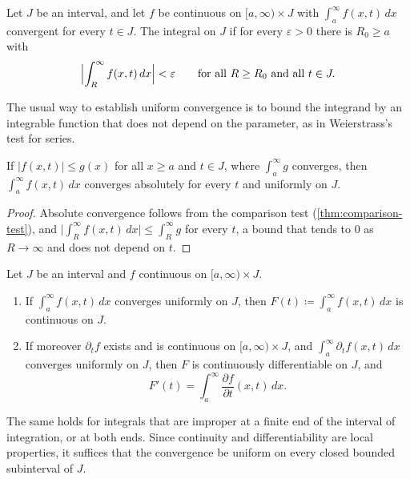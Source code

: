 \begin{definition}
\label{def:uniform-convergence-integral}
Let $J$ be an interval, and let $f$ be continuous on $[a,\infty)\times J$ with $\int_a^\infty f(x,t)\,dx$ convergent for every $t\in J$. The integral  on $J$ if for every $\varepsilon>0$ there is $R_0\ge a$ with
\[
\Bigl|\int_R^\infty f(x,t)\,dx\Bigr|<\varepsilon\qquad\text{for all }R\ge R_0\text{ and all }t\in J .
\]
\end{definition}

The usual way to establish uniform convergence is to bound the integrand by an integrable function that does not depend on the parameter, as in Weierstrass's test for series.

\begin{proposition}[Domination]
\label{prop:weierstrass-test}
If $|f(x,t)|\le g(x)$ for all $x\ge a$ and $t\in J$, where $\int_a^\infty g$ converges, then $\int_a^\infty f(x,t)\,dx$ converges absolutely for every $t$ and uniformly on $J$.
\end{proposition}

\begin{proof}
Absolute convergence follows from the comparison test (\cref{thm:comparison-test}), and $\bigl|\int_R^\infty f(x,t)\,dx\bigr|\le\int_R^\infty g$ for every $t$, a bound that tends to $0$ as $R\to\infty$ and does not depend on $t$.
\end{proof}

\begin{theorem}
\label{thm:parameter-improper}
Let $J$ be an interval and $f$ continuous on $[a,\infty)\times J$.
\begin{enumerate}
\item If $\int_a^\infty f(x,t)\,dx$ converges uniformly on $J$, then $F(t)\coloneqq\int_a^\infty f(x,t)\,dx$ is continuous on $J$.
\item If moreover $\partial_tf$ exists and is continuous on $[a,\infty)\times J$, and $\int_a^\infty\partial_tf(x,t)\,dx$ converges uniformly on $J$, then $F$ is continuously differentiable on $J$, and
\[
F'(t)=\int_a^\infty\frac{\partial f}{\partial t}(x,t)\,dx .
\]
\end{enumerate}
The same holds for integrals that are improper at a finite end of the interval of integration, or at both ends. Since continuity and differentiability are local properties, it suffices that the convergence be uniform on every closed bounded subinterval of $J$.
\end{theorem}

